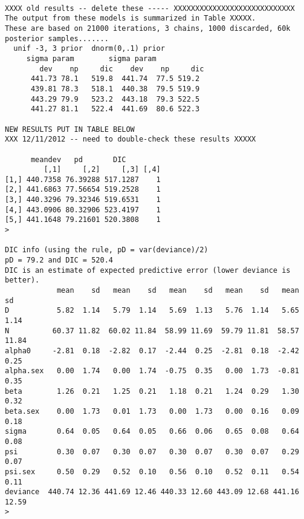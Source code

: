 \begin{verbatim}

XXXX old results -- delete these ----- XXXXXXXXXXXXXXXXXXXXXXXXXXXX
The output from these models is summarized in Table XXXXX.
These are based on 21000 iterations, 3 chains, 1000 discarded, 60k
posterior samples.......
  unif -3, 3 prior  dnorm(0,.1) prior
     sigma param        sigma param
        dev    np     dic    dev    np     dic
      441.73 78.1   519.8  441.74  77.5 519.2
      439.81 78.3   518.1  440.38  79.5 519.9
      443.29 79.9   523.2  443.18  79.3 522.5
      441.27 81.1   522.4  441.69  80.6 522.3

NEW RESULTS PUT IN TABLE BELOW
XXX 12/11/2012 -- need to double-check these results XXXXX

      meandev   pd       DIC
         [,1]     [,2]     [,3] [,4]
[1,] 440.7358 76.39288 517.1287    1
[2,] 441.6863 77.56654 519.2528    1
[3,] 440.3296 79.32346 519.6531    1
[4,] 443.0906 80.32906 523.4197    1
[5,] 441.1648 79.21601 520.3808    1
> 

DIC info (using the rule, pD = var(deviance)/2)
pD = 79.2 and DIC = 520.4
DIC is an estimate of expected predictive error (lower deviance is better).
            mean    sd   mean    sd   mean    sd   mean    sd   mean    sd
D           5.82  1.14   5.79  1.14   5.69  1.13   5.76  1.14   5.65  1.14
N          60.37 11.82  60.02 11.84  58.99 11.69  59.79 11.81  58.57 11.84
alpha0     -2.81  0.18  -2.82  0.17  -2.44  0.25  -2.81  0.18  -2.42  0.25
alpha.sex   0.00  1.74   0.00  1.74  -0.75  0.35   0.00  1.73  -0.81  0.35
beta        1.26  0.21   1.25  0.21   1.18  0.21   1.24  0.29   1.30  0.32
beta.sex    0.00  1.73   0.01  1.73   0.00  1.73   0.00  0.16   0.09  0.18
sigma       0.64  0.05   0.64  0.05   0.66  0.06   0.65  0.08   0.64  0.08
psi         0.30  0.07   0.30  0.07   0.30  0.07   0.30  0.07   0.29  0.07
psi.sex     0.50  0.29   0.52  0.10   0.56  0.10   0.52  0.11   0.54  0.11
deviance  440.74 12.36 441.69 12.46 440.33 12.60 443.09 12.68 441.16 12.59
> 
\end{verbatim}


